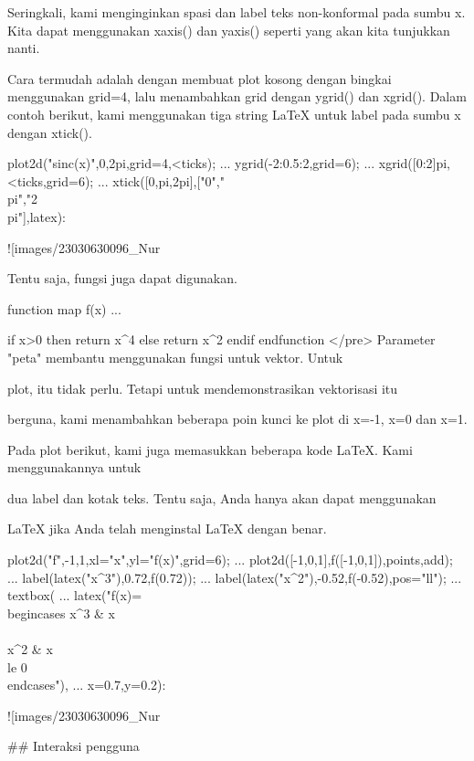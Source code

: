 \documentclass{article}
\begin{document}
Seringkali, kami menginginkan spasi dan label teks non-konformal pada
sumbu x. Kita dapat menggunakan xaxis() dan yaxis() seperti yang akan
kita tunjukkan nanti.


Cara termudah adalah dengan membuat plot kosong dengan bingkai
menggunakan grid=4, lalu menambahkan grid dengan ygrid() dan xgrid().
Dalam contoh berikut, kami menggunakan tiga string LaTeX untuk label
pada sumbu x dengan xtick().


\>plot2d("sinc(x)",0,2pi,grid=4,<ticks); ...  
\>   ygrid(-2:0.5:2,grid=6); ...  
\>   xgrid([0:2]\*pi,<ticks,grid=6);  ...  
\>   xtick([0,pi,2pi],["0","\\pi","2\\pi"],\>latex):


![images/23030630096_Nur%

Tentu saja, fungsi juga dapat digunakan.


\>function map f(x) ...


    if x>0 then return x^4
    else return x^2
    endif
    endfunction
</pre>
Parameter "peta" membantu menggunakan fungsi untuk vektor. Untuk


plot, itu tidak perlu. Tetapi untuk mendemonstrasikan vektorisasi itu


berguna, kami menambahkan beberapa poin kunci ke plot di x=-1, x=0 dan
x=1.


Pada plot berikut, kami juga memasukkan beberapa kode LaTeX. Kami
menggunakannya untuk


dua label dan kotak teks. Tentu saja, Anda hanya akan dapat
menggunakan


LaTeX jika Anda telah menginstal LaTeX dengan benar.


\>plot2d("f",-1,1,xl="x",yl="f(x)",grid=6);  ...  
\>   plot2d([-1,0,1],f([-1,0,1]),\>points,\>add); ...  
\>   label(latex("x^3"),0.72,f(0.72)); ...  
\>   label(latex("x^2"),-0.52,f(-0.52),pos="ll"); ...  
\>   textbox( ...  
\>     latex("f(x)=\\begin{cases} x^3 & x \\\\ x^2 & x \\le 0\\end{cases}"), ...  
\>     x=0.7,y=0.2):


![images/23030630096_Nur%

## Interaksi pengguna
\end{document}
